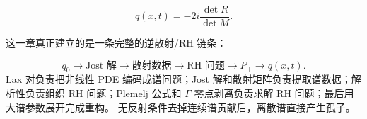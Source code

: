 \documentclass[
    lang=cn,
    scheme=chinese,
    mode=simple,
    device=normal,
    color=blue,
    math=cm,
    thmcnt=section,
    12pt
]{elegantbook}
\begin{document}
\[
    q(x,t)
    =
    -2i\dfrac{\det R}{\det M}.
\]

\begin{callout}[组会最后一句]
    这一章真正建立的是一条完整的逆散射/RH 链条：

    \[
        \boxed{
            q_0
            \longrightarrow
            \text{Jost 解}
            \longrightarrow
            \text{散射数据}
            \longrightarrow
            \text{RH 问题}
            \longrightarrow
            P_+
            \longrightarrow
            q(x,t).
        }
    \]
    Lax 对负责把非线性 PDE 编码成谱问题；Jost 解和散射矩阵负责提取谱数据；解析性负责组织 RH 问题；Plemelj 公式和 $\Gamma$ 零点剥离负责求解 RH 问题；最后用大谱参数展开完成重构。
    无反射条件去掉连续谱贡献后，离散谱直接产生孤子。
\end{callout}
\end{document}
